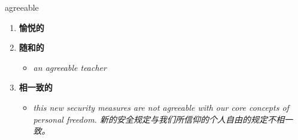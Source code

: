 
\begin{frame}
{\huge agreeable}
\begin{center}
\begin{enumerate}\Large
  \item \textbf{愉悦的}
  \item \textbf{随和的}
  \begin{itemize}
    \item \em{\Large{an agreeable teacher}}
  \end{itemize}
  \item \textbf{相一致的}
  \begin{itemize}
    \item \em{\Large{this new security measures are not agreeable with our core concepts of personal freedom. 新的安全规定与我们所信仰的个人自由的规定不相一致。}}
  \end{itemize}
\end{enumerate}
\end{center}
\end{frame}
